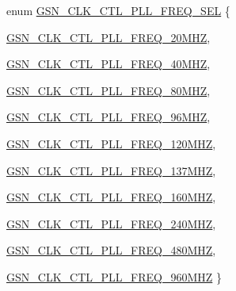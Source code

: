 \begin{DoxyCompactItemize}
enum \hyperlink{a00477_a7e6656786e3a4b1ea2697ba42a89457d}{GSN\_\-CLK\_\-CTL\_\-PLL\_\-FREQ\_\-SEL} \{ \par
\hyperlink{a00477_a7e6656786e3a4b1ea2697ba42a89457da0132e12ba1bc91c5b657071760c723f4}{GSN\_\-CLK\_\-CTL\_\-PLL\_\-FREQ\_\-20MHZ}, 
\par
\hyperlink{a00477_a7e6656786e3a4b1ea2697ba42a89457da8db8a779b105aea0193a082f2507ba58}{GSN\_\-CLK\_\-CTL\_\-PLL\_\-FREQ\_\-40MHZ}, 
\par
\hyperlink{a00477_a7e6656786e3a4b1ea2697ba42a89457da889b43c632745b076cf0f145409e0b67}{GSN\_\-CLK\_\-CTL\_\-PLL\_\-FREQ\_\-80MHZ}, 
\par
\hyperlink{a00477_a7e6656786e3a4b1ea2697ba42a89457da7fad9ce283fb96ee1265f0ee4c5c54fc}{GSN\_\-CLK\_\-CTL\_\-PLL\_\-FREQ\_\-96MHZ}, 
\par
\hyperlink{a00477_a7e6656786e3a4b1ea2697ba42a89457da29ef02350be4e713e80dec2077c0d7fb}{GSN\_\-CLK\_\-CTL\_\-PLL\_\-FREQ\_\-120MHZ}, 
\par
\hyperlink{a00477_a7e6656786e3a4b1ea2697ba42a89457dad5112a6509bb20c9746a0a02bea11ac8}{GSN\_\-CLK\_\-CTL\_\-PLL\_\-FREQ\_\-137MHZ}, 
\par
\hyperlink{a00477_a7e6656786e3a4b1ea2697ba42a89457da52d9d3e44199c404200eb24d6f6346ab}{GSN\_\-CLK\_\-CTL\_\-PLL\_\-FREQ\_\-160MHZ}, 
\par
\hyperlink{a00477_a7e6656786e3a4b1ea2697ba42a89457da9c9508a68ac2ec9bfa4412b0198f409f}{GSN\_\-CLK\_\-CTL\_\-PLL\_\-FREQ\_\-240MHZ}, 
\par
\hyperlink{a00477_a7e6656786e3a4b1ea2697ba42a89457daa7c7f2e2c12dbaf482142c4b451c91b6}{GSN\_\-CLK\_\-CTL\_\-PLL\_\-FREQ\_\-480MHZ}, 
\par
\hyperlink{a00477_a7e6656786e3a4b1ea2697ba42a89457da36e9be2ff782ebf1da92dbd8e1c265d9}{GSN\_\-CLK\_\-CTL\_\-PLL\_\-FREQ\_\-960MHZ}
 \}
\end{DoxyCompactItemize}

